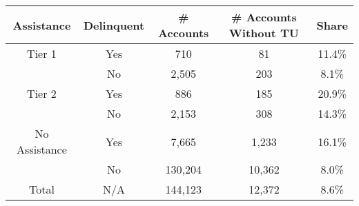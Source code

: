 \begin{tabular}{ccccc}
\toprule 
\midrule 
Assistance & Delinquent & \# Accounts & \# Accounts Without TU & Share \\
\midrule 
Tier 1 & Yes & 710 & 81 & 11.4\% \\
 & No & 2,505 & 203 & 8.1\% \\
\midrule 
Tier 2 & Yes & 886 & 185 & 20.9\% \\
 & No & 2,153 & 308 & 14.3\% \\
\midrule 
No Assistance & Yes & 7,665 & 1,233 & 16.1\% \\
 & No & 130,204 & 10,362 & 8.0\% \\
\midrule 
Total & N/A & 144,123 & 12,372 & 8.6\% \\
\midrule 
\bottomrule 
\end{tabular}

